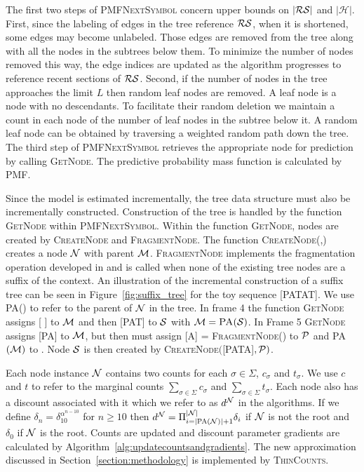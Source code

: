 The first two steps of \textsc{PMFNextSymbol} concern upper bounds on $|\RS|$ and $|\mathcal{H}|$.  First, since the labeling of edges in the tree reference $\RS$, when it is shortened, some edges may become unlabeled.  Those edges are removed from the tree along with all the nodes in the subtrees below them. To minimize the number of nodes removed this way, the edge indices are updated as the algorithm progresses to reference recent sections of $\RS$. Second, if the number of nodes in the tree approaches the limit $L$ then random leaf nodes are removed.  A leaf node is a node with no descendants. To facilitate their random deletion we maintain a count in each node of the number of leaf nodes in the subtree below it.  A random leaf node can be obtained by traversing a weighted random path down the tree.  The third step of \textsc{PMFNextSymbol} retrieves the appropriate node for prediction by calling \textsc{GetNode}. The predictive probability mass function is calculated by \textsc{PMF}.

Since the model is estimated incrementally, the tree data structure must also be incrementally constructed.  Construction of the tree is handled by the function \textsc{GetNode} within \textsc{PMFNextSymbol}.  Within the function \textsc{GetNode}, nodes are created by \textsc{CreateNode} and \textsc{FragmentNode}. The function \textsc{CreateNode(\N,\M)} creates a node $\N$ with parent $\M$. \textsc{FragmentNode} implements the fragmentation operation developed in \citep{Wood2009} and is called when none of the existing tree nodes are a suffix of the context.  An illustration of the incremental construction of a suffix tree can be seen in Figure~\ref{fig:suffix_tree} for the toy sequence [PATAT].  We use \textsc{PA}(\N) to refer to the parent of $\N$ in the tree.  In frame 4 the function \textsc{GetNode} assigns [ ]  to $\M$ and then [PAT] to $\Seq$ with $\M = \textsc{PA}(\Seq)$. In Frame 5 \textsc{GetNode} assigns [PA] to $\M$, but then must assign [A] = \textsc{FragmentNode}(\M) to $\PP$ and \textsc{PA}$(\M)$ to \PP.  Node $\Seq$ is then created by \textsc{CreateNode}$($[PATA]$,\PP)$.   %

Each node instance $\N$ contains two counts for each $\sigma \in \Sigma$, $c_\sigma$ and $t_\sigma$.  We use $c$ and $t$ to refer to the marginal counts $\sum_{\sigma \in \Sigma} c_\sigma$ and $\sum_{\sigma \in \Sigma} t_\sigma$.  Each node also has a discount associated with it which we refer to as $d^\N$ in the algorithms. If we define $\delta_{n} = \delta_{10}^{\alpha^{n - 10}}$ for $n \geq 10$ then $d^{\N} = \Pi_{i =|\textsc{PA}(\N)| + 1}^{|\N|} \delta_{i}$ if $\N$ is not the root and $\delta_{0}$ if $\N$ is the root.  Counts are updated and discount parameter gradients are calculated by Algorithm~\ref{alg:updatecountsandgradients}.  The new approximation discussed in Section~\ref{section:methodology} is implemented by \textsc{ThinCounts}.

